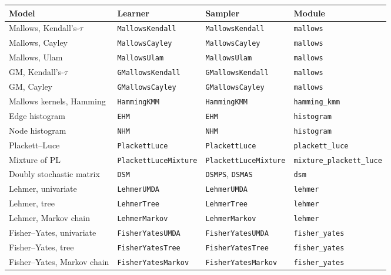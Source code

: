 \documentclass[a4paper,11pt]{article}
\begin{document}
\begin{table}[ht]
\centering
\small
\setlength{\tabcolsep}{3pt}
\begin{adjustbox}{max width=\textwidth}
\begin{tabular}{llll}
\toprule
\textbf{Model} & \textbf{Learner} & \textbf{Sampler} & \textbf{Module} \\
\midrule
Mallows, Kendall's-$\tau$ & \texttt{MallowsKendall} & \texttt{MallowsKendall} & \texttt{mallows} \\
Mallows, Cayley & \texttt{MallowsCayley} & \texttt{MallowsCayley} & \texttt{mallows} \\
Mallows, Ulam & \texttt{MallowsUlam} & \texttt{MallowsUlam} & \texttt{mallows} \\
GM, Kendall's-$\tau$ & \texttt{GMallowsKendall} & \texttt{GMallowsKendall} & \texttt{mallows} \\
GM, Cayley & \texttt{GMallowsCayley} & \texttt{GMallowsCayley} & \texttt{mallows} \\
Mallows kernels, Hamming & \texttt{HammingKMM} & \texttt{HammingKMM} & \texttt{hamming\_kmm} \\
Edge histogram & \texttt{EHM} & \texttt{EHM} & \texttt{histogram} \\
Node histogram & \texttt{NHM} & \texttt{NHM} & \texttt{histogram} \\
Plackett--Luce & \texttt{PlackettLuce} & \texttt{PlackettLuce} & \texttt{plackett\_luce} \\
Mixture of PL & \texttt{PlackettLuceMixture} & \texttt{PlackettLuceMixture} & \texttt{mixture\_plackett\_luce} \\
Doubly stochastic matrix & \texttt{DSM} & \texttt{DSMPS}, \texttt{DSMAS} & \texttt{dsm} \\
Lehmer, univariate & \texttt{LehmerUMDA} & \texttt{LehmerUMDA} & \texttt{lehmer} \\
Lehmer, tree & \texttt{LehmerTree} & \texttt{LehmerTree} & \texttt{lehmer} \\
Lehmer, Markov chain & \texttt{LehmerMarkov} & \texttt{LehmerMarkov} & \texttt{lehmer} \\
Fisher--Yates, univariate & \texttt{FisherYatesUMDA} & \texttt{FisherYatesUMDA} & \texttt{fisher\_yates} \\
Fisher--Yates, tree & \texttt{FisherYatesTree} & \texttt{FisherYatesTree} & \texttt{fisher\_yates} \\
Fisher--Yates, Markov chain & \texttt{FisherYatesMarkov} & \texttt{FisherYatesMarkov} & \texttt{fisher\_yates} \\

\end{tabular}
\end{adjustbox}
\end{table}
\end{document}
